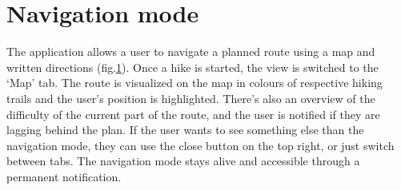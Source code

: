 \section{Navigation mode}
The application allows a user to navigate a planned route using a map and written directions (fig.\ref{fig:navigation}).
Once a hike is started, the view is switched to the `Map' tab.
The route is visualized on the map in colours of respective hiking trails and the user's position is highlighted.
There's also an overview of the difficulty of the current part of the route, and the user is notified if they are lagging behind the plan.
If the user wants to see something else than the navigation mode, they can use the close button on the top right, or just switch between tabs.
The navigation mode stays alive and accessible through a permanent notification.

\begin{figure}[h!]
    \centering
    \label{fig:navigation}
\end{figure}